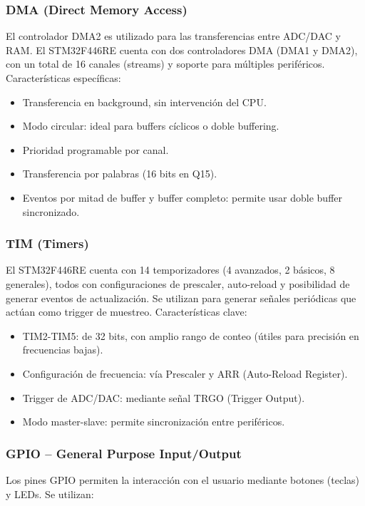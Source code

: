 \documentclass[12pt]{article}
\begin{document}
	\subsubsection{DMA (Direct Memory Access)}
	El controlador DMA2 es utilizado para las transferencias entre ADC/DAC y RAM. El STM32F446RE cuenta con dos controladores DMA (DMA1 y DMA2), con un total de 16 canales (streams) y soporte para múltiples periféricos. Características específicas:
	
	\begin{itemize}
		\item Transferencia en background, sin intervención del CPU.
		
		\item Modo circular: ideal para buffers cíclicos o doble buffering.
		
		\item Prioridad programable por canal.
		
		\item Transferencia por palabras (16 bits en Q15).
		
		\item Eventos por mitad de buffer y buffer completo: permite usar doble buffer sincronizado.
	\end{itemize}
	
	\subsubsection{TIM (Timers)}
	El STM32F446RE cuenta con 14 temporizadores (4 avanzados, 2 básicos, 8 generales), todos con configuraciones de prescaler, auto-reload y posibilidad de generar eventos de actualización. Se utilizan para generar señales periódicas que actúan como trigger de muestreo. Características clave:
	\begin{itemize}
		\item TIM2-TIM5: de 32 bits, con amplio rango de conteo (útiles para precisión en frecuencias bajas).
		
		\item Configuración de frecuencia: vía Prescaler y ARR (Auto-Reload Register).
		
		\item Trigger de ADC/DAC: mediante señal TRGO (Trigger Output).
		
		\item Modo master-slave: permite sincronización entre periféricos.
	\end{itemize}
	
	\subsubsection{GPIO – General Purpose Input/Output}
	Los pines GPIO permiten la interacción con el usuario mediante botones (teclas) y LEDs. Se utilizan:
	
\end{document}
